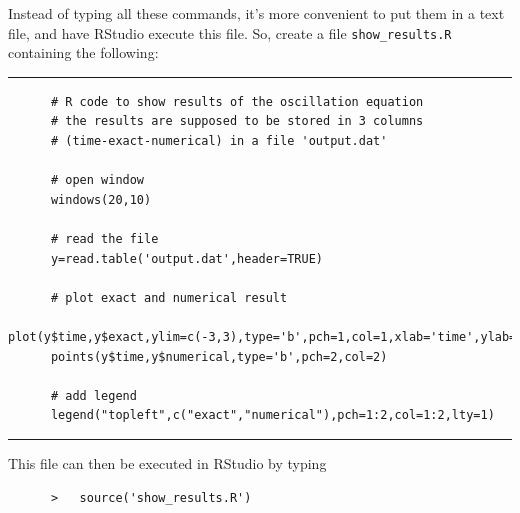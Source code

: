 \documentclass[a4paper]{article}
\begin{document}
%
\par
Instead of typing all these commands, it's more convenient to put them in a text file, and have RStudio execute this file. So, create a file \verb+show_results.R+ containing the following:
%
{\vspace{15pt}\hrule\small\vspace*{-2pt}\begin{verbatim}
	  # R code to show results of the oscillation equation
	  # the results are supposed to be stored in 3 columns 
	  # (time-exact-numerical) in a file 'output.dat'
	  
	  # open window
	  windows(20,10)
	  
	  # read the file
	  y=read.table('output.dat',header=TRUE)
	  
	  # plot exact and numerical result
	  plot(y$time,y$exact,ylim=c(-3,3),type='b',pch=1,col=1,xlab='time',ylab='solution')
	  points(y$time,y$numerical,type='b',pch=2,col=2)

	  # add legend
	  legend("topleft",c("exact","numerical"),pch=1:2,col=1:2,lty=1)
\end{verbatim}\hrule\vspace{5pt}}
%
This file can then be executed in RStudio by typing
%
\begin{verbatim}
	  >   source('show_results.R')
\end{verbatim}
%
\end{document}
